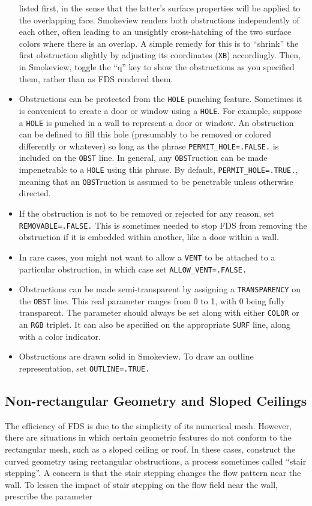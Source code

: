 \documentclass[11pt]{book}
\newcommand{\ct}{\tt\small}
\begin{document}
\begin{itemize}
listed first, in the sense that the latter's surface properties will be applied to the overlapping face. Smokeview renders both obstructions
independently of each other, often leading to an unsightly cross-hatching of the two surface colors where there is an overlap. A
simple remedy for this is to ``shrink'' the first obstruction slightly by adjusting its coordinates ({\ct XB}) accordingly. Then, in
Smokeview, toggle the ``q'' key to show the obstructions as you specified them, rather than as FDS rendered them.
\item Obstructions can be protected from the {\ct HOLE} punching feature. Sometimes
it is convenient to create a door or window using a {\ct HOLE}. For example, suppose a
{\ct HOLE} is punched in a wall to represent a door or window. An obstruction can be
defined to fill this hole (presumably to be removed or colored differently or whatever) so
long as the phrase {\ct PERMIT\_HOLE=.FALSE.} is included on the {\ct OBST} line. In general,
any {\ct OBST}ruction can be made impenetrable to a {\ct HOLE} using this phrase. By default,
{\ct PERMIT\_HOLE=.TRUE.}, meaning that an {\ct OBST}ruction is assumed to be penetrable unless
otherwise directed.
\item If the obstruction is not to be removed or rejected for any reason, set {\ct REMOVABLE=.FALSE.} This is sometimes needed to stop
FDS from removing the obstruction if it is embedded within another, like a door within a wall.
\item In rare cases, you might not want to allow a {\ct VENT} to be attached to a particular obstruction, in which case set
{\ct ALLOW\_VENT=.FALSE.}
\item Obstructions can be made semi-transparent by assigning a {\ct TRANSPARENCY} on the {\ct OBST} line. This real parameter ranges from
0 to 1, with 0 being fully transparent. The parameter should always be set along with either {\ct COLOR} or an {\ct RGB} triplet. It can
also be specified on the appropriate {\ct SURF} line, along with a color indicator.
\item Obstructions are drawn solid in Smokeview. To draw an outline representation, set {\ct OUTLINE=.TRUE.}
\end{itemize}

\subsection{Non-rectangular Geometry and Sloped Ceilings}
\label{info:SAWTOOTH}
The efficiency of FDS is due to the simplicity of its numerical mesh.
However, there are situations in which certain geometric features do
not conform to the rectangular mesh, such as a sloped ceiling or roof. In these cases,
construct the curved geometry using rectangular obstructions, a process
sometimes called ``stair stepping''. A concern is that
the stair stepping changes the flow pattern near the wall. To lessen
the impact of stair stepping on the flow field near the wall,
prescribe the parameter
\end{document}
